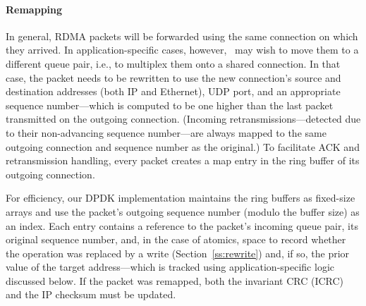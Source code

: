 \paragraph{Remapping}
\label{ss:remapping}
In general, RDMA packets will be forwarded using the same connection on
which they arrived.  In application-specific cases, however,
\sword\ may wish to move them to a different queue pair, i.e., to
multiplex them onto a shared connection.  In that case, the packet
needs to be rewritten to use the new connection's source and
destination addresses (both IP and Ethernet), UDP port, and an
appropriate sequence number---which is computed to be one higher than
the last packet transmitted on the outgoing connection.  (Incoming
retransmissions---detected due to their non-advancing sequence
number---are always mapped to the same outgoing connection and
sequence number as the original.)  To facilitate ACK and
retransmission handling, every packet creates a map entry in
the ring buffer of its outgoing connection.

For efficiency, our DPDK implementation maintains the ring buffers as fixed-size arrays and
use the packet's outgoing sequence number (modulo the buffer size) as
an index.  Each entry contains a reference to the packet's incoming
queue pair, its original sequence number, and, in the case of atomics,
space to record whether the operation was replaced by
a write (Section~\ref{ss:rewrite}) and, if so, the prior value of the
target address---which is tracked using application-specific logic
discussed below.
%
If the packet was remapped, both the invariant CRC (ICRC) and the IP checksum must be updated.  


